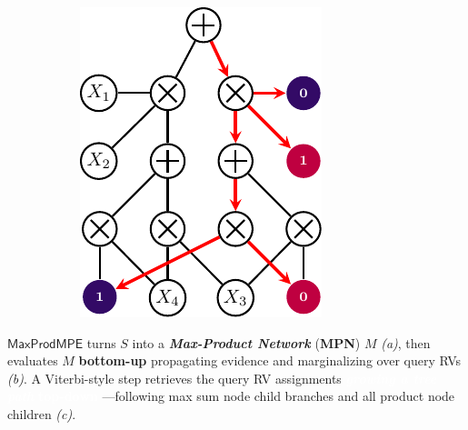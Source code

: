 \documentclass[xcolor={usenames,dvipsnames,svgnames}, compress]{beamer}
\newcommand{\argmax}{\operatornamewithlimits{argmax}}
\newcommand{\highlighttext}[2][yellow]{{\colorbox{#1}{\textcolor{white}{#2}}}}
\newcommand{\customcitenomark}[1]{\footnotenomarkleft{\tiny
    \citeauthor{#1}, \citetitle{#1}, \citeyear{#1}}}
\begin{document}
\begin{frame}[t]
\begin{figure}[!ht]
\begin{subfigure}[b]{0.15\columnwidth}
     \includegraphics[width=1.0\columnwidth]
     {figures/mpn-eval-iii}%
   \end{subfigure}\hspace{5pt}\parbox[b][30pt][b]{0.03\columnwidth}{\subcaption{\label{fig:mpn-eval-iii}}}
 \end{figure}%


$\mathsf{MaxProdMPE}$ turns $S$ into a \emph{\textbf{Max-Product
     Network}} (\textbf{MPN}) $M$ \emph{(a)}, then evaluates $M$ \textbf{bottom-up}
 propagating evidence and marginalizing over query RVs \emph{(b)}.
A Viterbi-style step
retrieves the query RV assignments \highlighttext[tomato0]{\emph{\textbf{growing a tree
path}} \textbf{top-down}} ---following max sum node child branches and all
product node children \emph{(c)}.

\end{frame}
\end{document}
